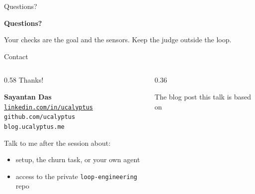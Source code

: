 \documentclass[aspectratio=169]{beamer}
\begin{document}
\begin{frame}{Questions?}
  \begin{center}
    {\Huge\textbf{Questions?}}

    \vspace{0.6cm}
    \small Your checks are the goal and the sensors. Keep the judge outside the loop.
  \end{center}
\end{frame}

\begin{frame}{Contact}
  \begin{columns}[c]
    \begin{column}{0.58\textwidth}
      {\Huge\calligra Thanks!}

      \vspace{0.4cm}
      \textbf{Sayantan Das}\\
      \small
      \href{https://www.linkedin.com/in/ucalyptus/}{\texttt{linkedin.com/in/ucalyptus}}\\
      \texttt{github.com/ucalyptus}\\
      \texttt{blog.ucalyptus.me}

      \vspace{0.3cm}
      Talk to me after the session about:
      \begin{itemize}
        \item setup, the churn task, or your own agent
        \item access to the private \texttt{loop-engineering} repo
      \end{itemize}
    \end{column}
    \begin{column}{0.36\textwidth}
      \centering

      \vspace{0.15cm}
      \scriptsize The blog post this talk is based on
    \end{column}
  \end{columns}
\end{frame}
\end{document}
